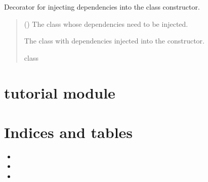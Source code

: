 \documentclass[letterpaper,10pt,english]{sphinxmanual}
\begin{document}
\begin{fulllineitems}
\label{\detokenize{inject:inject.Inject}}
\pysigstartsignatures
{}
\pysigstopsignatures
\sphinxAtStartPar
Decorator for injecting dependencies into the class constructor.
\begin{quote}\begin{description}
\sphinxAtStartPar
{} () \textendash{} The class whose dependencies need to be injected.

\sphinxAtStartPar
The class with dependencies injected into the constructor.

\sphinxAtStartPar
class

\end{description}\end{quote}

\end{fulllineitems}


\sphinxstepscope


\chapter{tutorial module}
\label{\detokenize{tutorial:tutorial-module}}\label{\detokenize{tutorial::doc}}

\chapter{Indices and tables}
\label{\detokenize{index:indices-and-tables}}\begin{itemize}
\item {} 
\sphinxAtStartPar
{}

\item {} 
\sphinxAtStartPar
{}

\item {} 
\sphinxAtStartPar
{}

\end{itemize}
\end{document}
